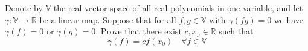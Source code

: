 Denote by \(\mathbb{V}\) the real vector space of all real polynomials in one variable, and let \(\gamma \colon \mathbb{V}\to \mathbb{R}\) be a linear map. Suppose that for all \(f,g\in \mathbb{V}\) with \(\gamma(fg)=0\) we have \(\gamma(f)=0\) or \(\gamma(g)=0\). Prove that there exist \(c,x_0\in \mathbb{R}\) such that
\[ \gamma(f)=cf(x_0)\quad \forall f\in \mathbb{V}\]